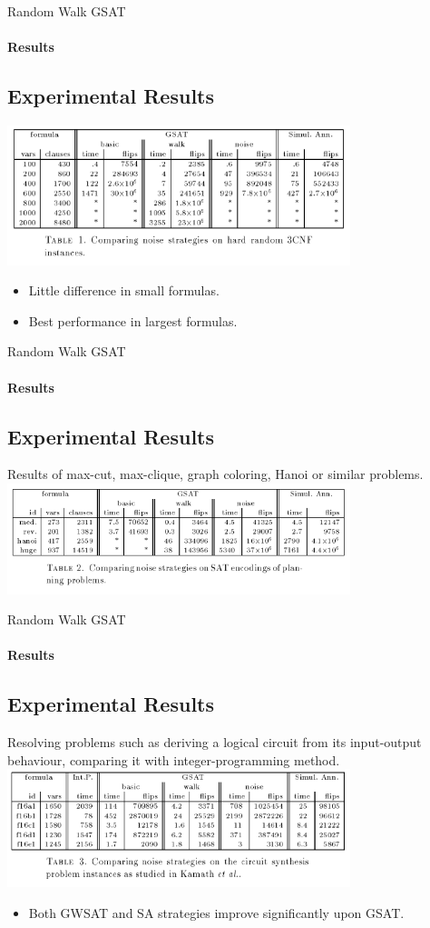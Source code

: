 \documentclass{beamer}
\begin{document}
\begin{frame}{Random Walk GSAT}
\framesubtitle{Results}
\subsection{Experimental Results}
\includegraphics[width=10cm]{imgs/tab1.png}
\begin{itemize}
	\item Little difference in small formulas.
	\item Best performance in largest formulas.
\end{itemize}
\end{frame}
\begin{frame}{Random Walk GSAT}
\framesubtitle{Results}
\subsection{Experimental Results}
Results of max-cut, max-clique, graph coloring, Hanoi or similar problems.
\includegraphics[width=10cm]{imgs/tab2.png}
\end{frame}

\begin{frame}{Random Walk GSAT}
\framesubtitle{Results}
\subsection{Experimental Results}
Resolving problems such as deriving a logical circuit from its input-output behaviour, comparing it with integer-programming method.
\includegraphics[width=10cm]{imgs/tab3.png}
\begin{itemize}
\item Both GWSAT and SA strategies improve significantly upon GSAT.
\end{itemize}

\end{frame}
\end{document}
